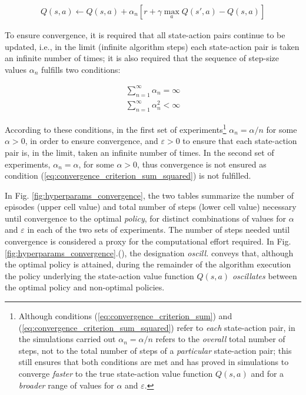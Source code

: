 \documentclass[a4paper]{article}
\begin{document}
\begin{align*}
Q(s,a) \gets Q(s,a) + \alpha_n \left[ {r + \gamma \max_{a} Q(s',a) - Q(s,a)} \right]
\end{align*}

To ensure convergence, it is required that all state-action pairs continue to be updated, i.e., in the limit (infinite algorithm steps) each state-action pair is taken an infinite number of times; it is also required that the sequence of step-size values $\alpha_n$ fulfills two conditions:

\begin{align}
\sum\limits_{n=1}^{\infty} \alpha_{n} = \infty \label{eq:convergence_criterion_sum}\\ 
\sum\limits_{n=1}^{\infty} \alpha_{n}^{2} < \infty \label{eq:convergence_criterion_sum_squared}
\end{align}

According to these conditions, in the first set of experiments\footnote{Although conditions (\ref{eq:convergence_criterion_sum}) and (\ref{eq:convergence_criterion_sum_squared}) refer to \textit{each} state-action pair, in the simulations carried out $\alpha_n = \alpha / n$ refers to the \textit{overall} total number of steps, not to the total number of steps of a \textit{particular} state-action pair; this still ensures that both conditions are met and has proved in simulations to converge \textit{faster} to the true state-action value function $Q(s,a)$ and for a \textit{broader} range of values for $\alpha$ and $\varepsilon$.} $\alpha_n = \alpha / n$ for some $\alpha > 0$, in order to ensure convergence,  and $\varepsilon > 0$ to ensure that each state-action pair is, in the limit, taken an infinite number of times. In the second set of experiments, $\alpha_n = \alpha$, for some $\alpha > 0$, thus convergence is not ensured as condition (\ref{eq:convergence_criterion_sum_squared}) is not fulfilled.

In Fig. \ref{fig:hyperparams_convergence}, the two tables summarize the number of episodes (upper cell value) and total number of steps (lower cell value) necessary until convergence to the optimal \textit{policy}, for distinct combinations of values for $\alpha$ and $\varepsilon$ in each of the two sets of experiments. The number of steps needed until convergence is considered a proxy for the computational effort required. In Fig. \ref{fig:hyperparams_convergence}.(), the designation \textit{oscill.} conveys that, although the optimal policy is attained, during the remainder of the algorithm execution the policy underlying the state-action value function $Q(s,a)$ \textit{oscillates} between the optimal policy and non-optimal policies. 
\end{document}
